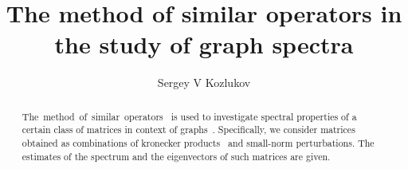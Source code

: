 \documentclass[a4paper]{jpconf}
\begin{document}
\title{The method of similar operators in the study of graph spectra}

\author{Sergey V Kozlukov}

\address{\emph{Voronezh State University}, 1 Universitetskaya Ploshad', Voronezh, RU 394036}


\begin{abstract}
    The~method~of~similar~operators~\cite{baskakov1983methods,baskakov2014memory,baskakov2017method,baskakov2013completeness}
        is used to investigate spectral properties
        of a certain class of matrices in context of graphs~\cite{van2003graphs,cvetkovic1980spectra}.
    Specifically, we consider matrices
        obtained as combinations
        of kronecker products~\cite{bellman-matrices-kron,XIANG2005210}
        and small-norm perturbations.
    The estimates of the spectrum and the eigenvectors
        of such matrices are given.
\end{abstract}
\end{document}
